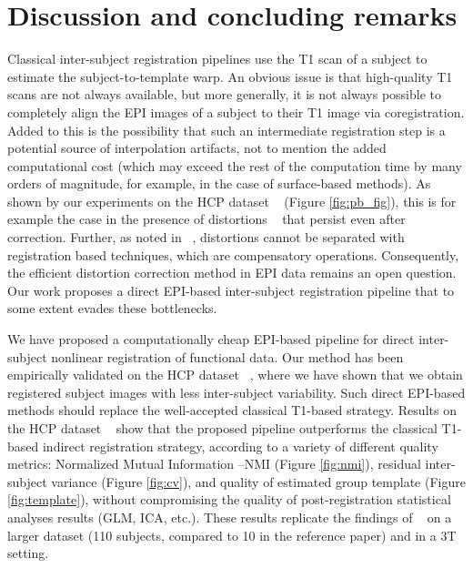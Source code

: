 \section{Discussion and concluding remarks}
\label{sec:discussion}
Classical inter-subject registration pipelines use the T1 scan of a
subject to estimate the subject-to-template warp.
%
An obvious issue is that high-quality T1 scans are not always
available, but more generally, it is not always possible to completely
align the EPI images of a subject to their T1 image via
coregistration. Added to this is the possibility that such an intermediate registration step is
a potential source of interpolation artifacts, not to mention the added computational cost (which may exceed the rest of the computation time by many orders of magnitude, for example, in the case of surface-based methods). As shown by our experiments on the HCP dataset
~\citep{VanEssen20122222} (Figure \ref{fig:pb_fig}), this is for example
the case in the presence of distortions
~\citep{pmid9178246,pmid12270226,zeng2002,anderson2003} that persist
even after correction.  Further, as noted in ~\citep{pmid25405472},
distortions cannot be separated with registration based techniques,
which are compensatory operations. Consequently, the efficient
distortion correction method in EPI data remains an
open question. Our work proposes a direct EPI-based inter-subject
registration pipeline that to some extent evades these bottlenecks.

We have proposed a computationally cheap EPI-based pipeline for direct inter-subject nonlinear registration of functional data. Our method has been empirically validated on the HCP dataset ~\citep{VanEssen20122222}, where we have shown that we obtain registered subject images with less inter-subject variability. Such direct EPI-based methods should replace the well-accepted classical
T1-based strategy.
Results on the HCP dataset ~\citep{VanEssen20122222} show that the proposed pipeline outperforms the classical T1-based indirect registration strategy, according to a variety of different quality metrics: Normalized Mutual Information --NMI (Figure \ref{fig:nmi}), residual inter-subject
variance (Figure \ref{fig:cv}), and quality of estimated group template (Figure \ref{fig:template}), without compromising the quality of post-registration statistical analyses results (GLM, ICA, etc.).
These results replicate the findings of ~\citep{grabner2014} on a larger dataset (110 subjects, compared to 10 in the reference paper) and in a 3T setting.

